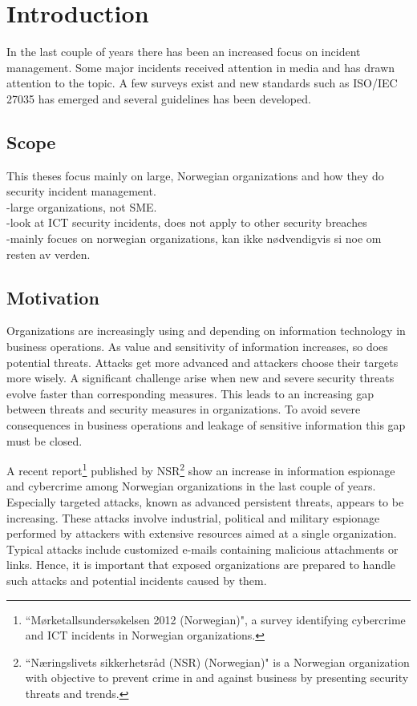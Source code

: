 \chapter{Introduction}
In the last couple of years there has been an increased focus on incident management. Some major incidents received attention in media and has drawn attention to the topic. A few surveys exist and new standards such as ISO/IEC 27035 has emerged and several guidelines has been developed.

\section{Scope}
This theses focus mainly on large, Norwegian organizations and how they do security incident management.\\

-large organizations, not SME.\\
-look at ICT security incidents, does not apply to other security breaches\\
-mainly focues on norwegian organizations, kan ikke nødvendigvis si noe om resten av verden.

\section{Motivation}
Organizations are increasingly using and depending on information technology in business operations. As value and sensitivity of information increases, so does potential threats. Attacks get more advanced and attackers choose their targets more wisely. A significant challenge arise when new and severe security threats evolve faster than corresponding measures. This leads to an increasing gap between threats and security measures in organizations. To avoid severe consequences in business operations and leakage of sensitive information this gap must be closed.

A recent report\footnote{``Mørketallsundersøkelsen 2012 (Norwegian)", a survey identifying cybercrime and ICT incidents in Norwegian organizations.} published by NSR\footnote{``Næringslivets sikkerhetsråd (NSR) (Norwegian)" is a Norwegian organization with objective to prevent crime in and against business by presenting security threats and trends.} show an increase in information espionage and cybercrime among Norwegian organizations in the last couple of years\cite{Morketall2012}. Especially targeted attacks, known as advanced persistent threats, appears to be increasing. These attacks involve industrial, political and military espionage performed by attackers with extensive resources aimed at a single organization. Typical attacks include customized e-mails containing malicious attachments or links. Hence, it is important that exposed organizations are prepared to handle such attacks and potential incidents caused by them. 

